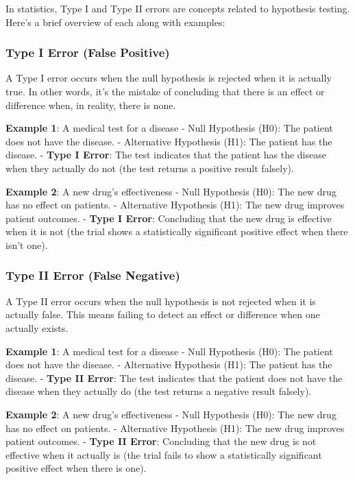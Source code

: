 \documentclass[12pt]{book}
\begin{document}
In statistics, Type I and Type II errors are concepts related to
hypothesis testing. Here's a brief overview of each along with examples:

\subsubsection{Type I Error (False
Positive)}\label{type-i-error-false-positive}

A Type I error occurs when the null hypothesis is rejected when it is
actually true. In other words, it's the mistake of concluding that there
is an effect or difference when, in reality, there is none.

\textbf{Example 1}: A medical test for a disease - Null Hypothesis (H0):
The patient does not have the disease. - Alternative Hypothesis (H1):
The patient has the disease. - \textbf{Type I Error}: The test indicates
that the patient has the disease when they actually do not (the test
returns a positive result falsely).

\textbf{Example 2}: A new drug's effectiveness - Null Hypothesis (H0):
The new drug has no effect on patients. - Alternative Hypothesis (H1):
The new drug improves patient outcomes. - \textbf{Type I Error}:
Concluding that the new drug is effective when it is not (the trial
shows a statistically significant positive effect when there isn't one).

\subsubsection{Type II Error (False
Negative)}\label{type-ii-error-false-negative}

A Type II error occurs when the null hypothesis is not rejected when it
is actually false. This means failing to detect an effect or difference
when one actually exists.

\textbf{Example 1}: A medical test for a disease - Null Hypothesis (H0):
The patient does not have the disease. - Alternative Hypothesis (H1):
The patient has the disease. - \textbf{Type II Error}: The test
indicates that the patient does not have the disease when they actually
do (the test returns a negative result falsely).

\textbf{Example 2}: A new drug's effectiveness - Null Hypothesis (H0):
The new drug has no effect on patients. - Alternative Hypothesis (H1):
The new drug improves patient outcomes. - \textbf{Type II Error}:
Concluding that the new drug is not effective when it actually is (the
trial fails to show a statistically significant positive effect when
there is one).
\end{document}
